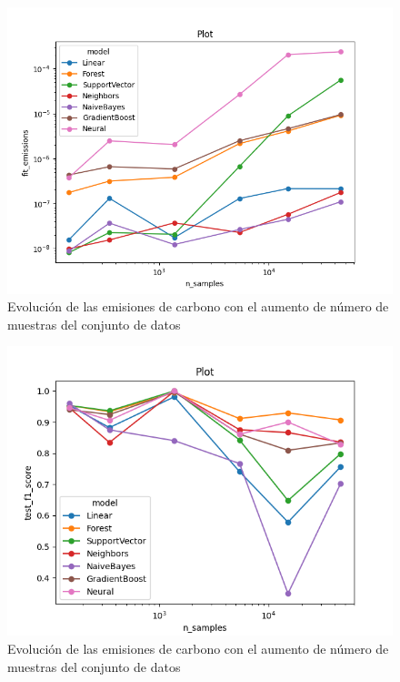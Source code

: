 \begin{figure}[H]
  \centerline{
     \includegraphics[width=1\textwidth, keepaspectratio]{img/graph/line-nsamples-emission-log.png}
  }
  \caption{Evolución de las emisiones de carbono con el aumento de número de muestras del conjunto de datos}
  \label{fig:line-emissions-samples}
\end{figure}
\begin{figure}[H]
  \centerline{
     \includegraphics[width=1\textwidth, keepaspectratio]{img/graph/line-nsamples-fscore-loglin.png}
  }
  \caption{Evolución de las emisiones de carbono con el aumento de número de muestras del conjunto de datos}
  \label{fig:line-fscore-samples}
\end{figure}

